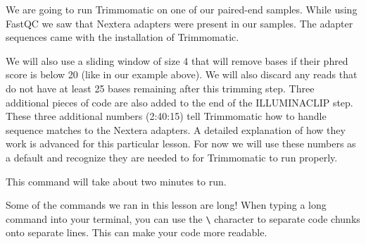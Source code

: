 \documentclass[
  letterpaper,
  DIV=11,
  numbers=noendperiod]{scrreprt}
\newenvironment{Shaded}{\begin{snugshade}}{\end{snugshade}}
\newcommand{\DataTypeTok}[1]{\textcolor[rgb]{0.68,0.00,0.00}{#1}}
\newcommand{\ExtensionTok}[1]{\textcolor[rgb]{0.00,0.23,0.31}{#1}}
\newcommand{\NormalTok}[1]{\textcolor[rgb]{0.00,0.23,0.31}{#1}}
\begin{document}
\begin{Shaded}
\end{Shaded}

We are going to run Trimmomatic on one of our paired-end samples. While
using FastQC we saw that Nextera adapters were present in our samples.
The adapter sequences came with the installation of Trimmomatic.

We will also use a sliding window of size 4 that will remove bases if
their phred score is below 20 (like in our example above). We will also
discard any reads that do not have at least 25 bases remaining after
this trimming step. Three additional pieces of code are also added to
the end of the ILLUMINACLIP step. These three additional numbers
(2:40:15) tell Trimmomatic how to handle sequence matches to the Nextera
adapters. A detailed explanation of how they work is advanced for this
particular lesson. For now we will use these numbers as a default and
recognize they are needed to for Trimmomatic to run properly.

\begin{Shaded}
\end{Shaded}

This command will take about two minutes to run.

\begin{tcolorbox}[enhanced jigsaw, toptitle=1mm, breakable, bottomrule=.15mm, colback=white, toprule=.15mm, opacityback=0, bottomtitle=1mm, coltitle=black, opacitybacktitle=0.6, rightrule=.15mm, colframe=quarto-callout-note-color-frame, titlerule=0mm, colbacktitle=quarto-callout-note-color!10!white, title=\textcolor{quarto-callout-note-color}{\faInfo}\hspace{0.5em}{About multiline commands}, left=2mm, leftrule=.75mm, arc=.35mm]

Some of the commands we ran in this lesson are long! When typing a long
command into your terminal, you can use the \texttt{\textbackslash{}}
character to separate code chunks onto separate lines. This can make
your code more readable.

\end{tcolorbox}
\end{document}
